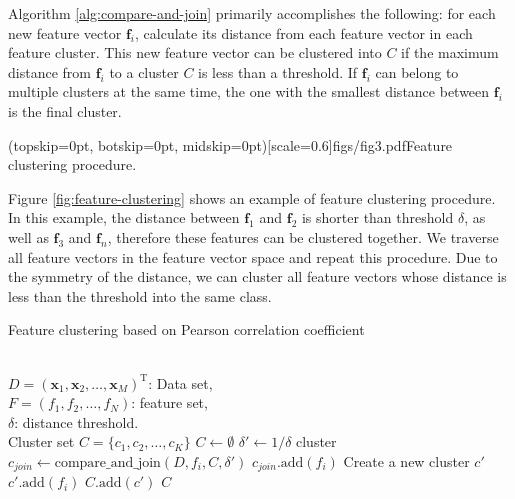\documentclass{ieeeaccess}
\theoremstyle{definition}
\begin{document}
Algorithm \ref{alg:compare-and-join} primarily accomplishes the following: for each new feature vector $\bm{f}_i$, calculate its distance from each feature vector in each feature cluster. This new feature vector can be clustered into $C$ if the maximum distance from $\bm{f}_i$ to a cluster $C$ is less than a threshold. If $\bm{f}_i$ can belong to multiple clusters at the same time, the one with the smallest distance between $\bm{f}_i$ is the final cluster.

\Figure[!htpb](topskip=0pt, botskip=0pt, midskip=0pt)[scale=0.6]{figs/fig3.pdf}{Feature clustering procedure. \label{fig:feature-clustering}}

Figure \ref{fig:feature-clustering} shows an example of feature clustering procedure. In this example, the distance between $\bm{f}_1$ and $\bm{f}_2$ is shorter than threshold $\delta$, as well as $\bm{f}_3$ and $\bm{f}_n$, therefore these features can be clustered together. We traverse all feature vectors in the feature vector space and repeat this procedure. Due to the symmetry of the distance, we can cluster all feature vectors whose distance is less than the threshold into the same class. 

\begin{algorithm}
    \caption{Feature clustering based on Pearson correlation coefficient}
    \label{alg:clustering}
    \begin{algorithmic}[1]
    \REQUIRE ~~\\
        $D=(\bm{x}_1,\bm{x}_2,\ldots,\bm{x}_M)^\text{T}$: Data set, \\
        $F=(f_1,f_2,\ldots,f_N)$: feature set, \\
        $\delta$: distance threshold.
    \ENSURE ~~\\
        Cluster set $C=\{c_1,c_2,\ldots,c_K\}$
    \STATE $C \gets \emptyset$
    \STATE $\delta' \gets 1 / \delta$
            \STATE cluster $c_{join} \gets \text{compare\_and\_join}(D, f_i, C, \delta')$
                \STATE $c_{join}\text{.add}(f_i)$
            \ELSE
                \STATE Create a new cluster $c'$
                \STATE $c'\text{.add}(f_i)$
                \STATE $C\text{.add}(c')$
            \ENDIF
        \ENDIF
    \ENDFOR
    \RETURN $C$
    \end{algorithmic}
    \end{algorithm}
\end{document}
